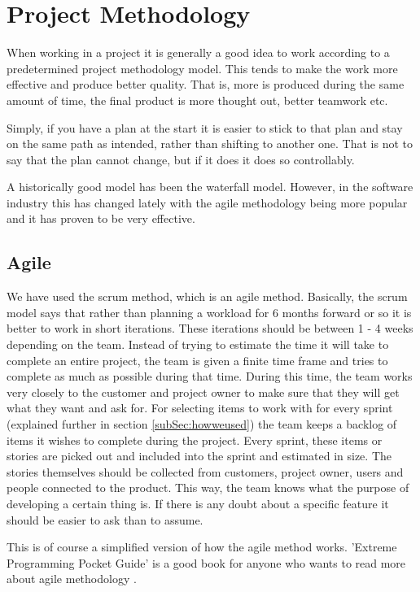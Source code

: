 \chapter{Project Methodology}

When working in a project it is generally a good idea to work according to a predetermined project methodology model. This tends to make the work more effective and produce better quality. That is, more is produced during the same amount of time, the final product is more thought out, better teamwork etc.

Simply, if you have a plan at the start it is easier to stick to that plan and stay on the same path as intended, rather than shifting to another one. That is not to say that the plan cannot change, but if it does it does so controllably.

A historically good model has been the waterfall model. However, in the software industry this has changed lately with the agile methodology being more popular and it has proven to be very effective.

\section{Agile}
We have used the scrum method, which is an agile method.
Basically, the scrum model says that rather than planning a workload for 6 months forward or so it is better to work in short iterations. These iterations should be between 1 - 4 weeks depending on the team.
Instead of trying to estimate the time it will take to complete an entire project, the team is given a finite time frame and tries to complete as much as possible during that time. During this time, the team works very closely to the customer and project owner to make sure that they will get what they want and ask for.
For selecting items to work with for every sprint (explained further in section \ref{subSec:howweused}) the team keeps a backlog of items it wishes to complete during the project. Every sprint, these items or stories are picked out and included into the sprint and estimated in size. The stories themselves should be collected from customers, project owner, users and people connected to the product. This way, the team knows what the purpose of developing a certain thing is. If there is any doubt about a specific feature it should be easier to ask than to assume.

This is of course a simplified version of how the agile method works.
'Extreme Programming Pocket Guide' is a good book for anyone who wants to read more about agile methodology \cite{extremeProgramming}
.
